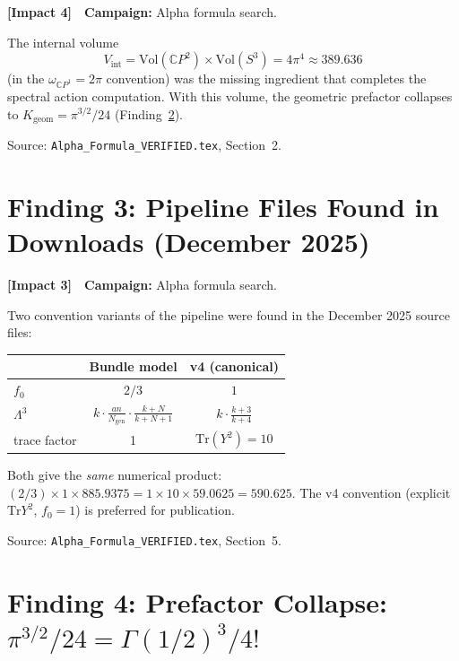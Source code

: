 \documentclass[11pt,a4paper]{article}
\newcommand{\impactfour}{\textcolor{impact4}{\textbf{[Impact 4]}}}
\newcommand{\impactthree}{\textcolor{impact3}{\textbf{[Impact 3]}}}
\newcommand{\CP}{\mathbb{C}P}
\newcommand{\Tr}{\mathrm{Tr}}
\begin{document}
\impactfour\ \ \textbf{Campaign:} Alpha formula search.

The internal volume
\[
V_{\mathrm{int}} = \mathrm{Vol}(\CP^2) \times \mathrm{Vol}(S^3)
= 4\pi^4 \approx 389.636
\]
(in the $\omega_{\CP^1} = 2\pi$ convention) was the missing ingredient
that completes the spectral action computation. With this volume, the
geometric prefactor collapses to $K_{\mathrm{geom}} = \pi^{3/2}/24$
(Finding~\ref{sec:prefactor-collapse}).

Source: \texttt{Alpha\_Formula\_VERIFIED.tex}, Section~2.


\section{Finding 3: Pipeline Files Found in Downloads (December 2025)}
\label{sec:pipeline}

\impactthree\ \ \textbf{Campaign:} Alpha formula search.

Two convention variants of the pipeline were found in the December 2025
source files:
\begin{center}
\begin{tabular}{lcc}
\toprule
& \textbf{Bundle model} & \textbf{v4 (canonical)} \\
\midrule
$f_0$ & $2/3$ & $1$ \\
$\Lambda^3$ & $k \cdot \frac{an}{N_{\mathrm{gen}}} \cdot \frac{k+N}{k+N+1}$
             & $k \cdot \frac{k+3}{k+4}$ \\
trace factor & 1 & $\Tr(Y^2) = 10$ \\
\bottomrule
\end{tabular}
\end{center}
Both give the \emph{same} numerical product: $(2/3) \times 1 \times 885.9375
= 1 \times 10 \times 59.0625 = 590.625$. The v4 convention (explicit
$\Tr Y^2$, $f_0 = 1$) is preferred for publication.

Source: \texttt{Alpha\_Formula\_VERIFIED.tex}, Section~5.


\section{Finding 4: Prefactor Collapse: $\pi^{3/2}/24 = \Gamma(1/2)^3/4!$}
\label{sec:prefactor-collapse}
\end{document}
